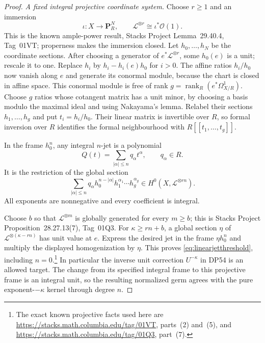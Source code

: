 \documentclass[11pt,a4paper]{article}
\theoremstyle{definition}\newtheorem{remark}[theorem]{Remark}
\begin{document}
\begin{proof}
\emph{A fixed integral projective coordinate system.}
Choose $r\ge1$ and an immersion
\[
 \iota:X\longrightarrow\mathbf P^N_R,
 \qquad \mathcal L^{\otimes r}\cong\iota^*\mathcal O(1).
\]
This is the known ample-power result, Stacks Project Lemma~29.40.4, Tag~01VT; properness makes the immersion closed.
Let $h_0,\ldots,h_N$ be the coordinate sections.
After choosing a generator of $e^*\mathcal L^{\otimes r}$, some $h_0(e)$ is a unit; rescale it to one.
Replace $h_i$ by $h_i-h_i(e)h_0$ for $i>0$.
The affine ratios $h_i/h_0$ now vanish along $e$ and generate its conormal module, because the chart is closed in affine space.
This conormal module is free of rank $g=\operatorname{rank}_R(e^*\Omega^1_{X/R})$.
Choose $g$ ratios whose cotangent matrix has a unit minor, by choosing a basis modulo the maximal ideal and using Nakayama's lemma.
Relabel their sections $h_1,\ldots,h_g$ and put $t_i=h_i/h_0$.
Their linear matrix is invertible over $R$, so formal inversion over $R$ identifies the formal neighbourhood with $R[[t_1,\ldots,t_g]]$.

In the frame $h_0^n$, any integral $n$-jet is a polynomial
\[
 Q(t)=\sum_{|\alpha|\le n}q_\alpha t^\alpha,
 \qquad q_\alpha\in R.
\]
It is the restriction of the global section
\[
 \sum_{|\alpha|\le n}q_\alpha
 h_0^{n-|\alpha|}h_1^{\alpha_1}\cdots h_g^{\alpha_g}
 \in H^0(X,\mathcal L^{\otimes rn}).
\]
All exponents are nonnegative and every coefficient is integral.

Choose $b$ so that $\mathcal L^{\otimes m}$ is globally generated for every $m\ge b$; this is Stacks Project Proposition~28.27.13(7), Tag~01Q3.
For $\kappa\ge rn+b$, a global section $\eta$ of $\mathcal L^{\otimes(\kappa-rn)}$ has unit value at $e$.
Express the desired jet in the frame $\eta h_0^n$ and multiply the displayed homogenization by $\eta$.
This proves \eqref{eq:linearjetthreshold}, including $n=0$.\footnote{The exact known projective facts used here are \url{https://stacks.math.columbia.edu/tag/01VT}, parts~(2) and~(5), and \url{https://stacks.math.columbia.edu/tag/01Q3}, part~(7).}
In particular the inverse unit correction $U^{-\kappa}$ in DP54 is an allowed target. The change from its specified integral frame to this projective frame is an integral unit, so the resulting normalized germ agrees with the pure exponent-$-\kappa$ kernel through degree $n$.


\end{proof}
\end{document}
